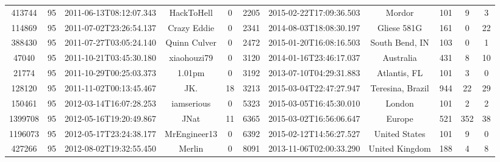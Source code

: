 \documentclass[12pt,a4paper,twoside,openright,titlepage,final]{article}
\begin{document}
\begin{enumerate}
\begin{table}[htbp!]
{\begin{tabular}{@{}ccccccccccc@{}}
			413744             & 95           & 2011-06-13T08:12:07.343 & HackToHell           & 0                  & 2205        & 2015-02-22T17:09:36.503 & Mordor                  & 101                 & 9                & 3              \\
			114869             & 95           & 2011-07-02T23:26:54.137 & Crazy Eddie          & 0                  & 2341        & 2014-08-03T18:08:30.197 & Gliese 581G             & 161                 & 0                & 22             \\
			388430             & 95           & 2011-07-27T03:05:24.140 & Quinn Culver         & 0                  & 2472        & 2015-01-20T16:08:16.503 & South Bend, IN          & 103                 & 0                & 1              \\
			47040              & 95           & 2011-10-21T03:45:30.180 & xiaohouzi79          & 0                  & 3120        & 2014-01-16T23:46:17.037 & Australia               & 431                 & 8                & 10             \\
			21774              & 95           & 2011-10-29T00:25:03.373 & 1.01pm               & 0                  & 3192        & 2013-07-10T04:29:31.883 & Atlantis, FL            & 101                 & 3                & 0              \\
			128120             & 95           & 2011-11-02T00:13:45.467 & JK.                  & 18                 & 3213        & 2015-03-04T22:47:27.947 & Teresina, Brazil        & 944                 & 22               & 29             \\
			150461             & 95           & 2012-03-14T16:07:28.253 & iamserious           & 0                  & 5323        & 2015-03-05T16:45:30.010 & London                  & 101                 & 2                & 2              \\
			1399708            & 95           & 2012-05-16T19:20:49.867 & JNat                 & 11                 & 6365        & 2015-03-02T16:56:06.647 & Europe                  & 521                 & 352              & 38             \\
			1196073            & 95           & 2012-05-17T23:24:38.177 & MrEngineer13         & 0                  & 6392        & 2015-02-12T14:56:27.527 & United States           & 101                 & 9                & 0              \\
			427266             & 95           & 2012-08-02T19:32:55.450 & Merlin               & 0                  & 8091        & 2013-11-06T02:00:33.290 & United Kingdom          & 188                 & 4                & 8              \\

\end{tabular}}
\end{table}
\end{enumerate}
\end{document}
